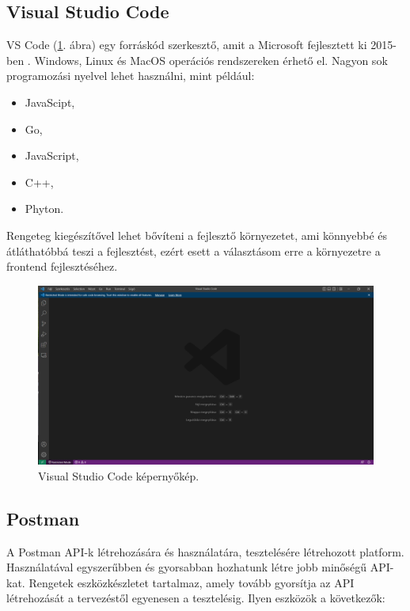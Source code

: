 \subsection{Visual Studio Code}

VS Code (\ref{fig:VSCode}. ábra) egy forráskód szerkesztő, amit a Microsoft fejlesztett ki 2015-ben \cite{VSCode}. Windows, Linux és MacOS operációs rendszereken érhető el. Nagyon sok programozási nyelvel lehet használni, mint például:

\begin{itemize}
\item JavaScipt,
\item Go,
\item JavaScript,
\item C++,
\item Phyton.
\end{itemize}

Rengeteg kiegészítővel lehet bővíteni a fejlesztő környezetet, ami könnyebbé és átláthatóbbá teszi a fejlesztést, ezért esett a választásom erre a környezetre a frontend fejlesztéséhez.

\begin{figure}[h]
\centering
\includegraphics[scale=0.6]{images/VSCode.png}
\caption{Visual Studio Code képernyőkép.}
\label{fig:VSCode}
\end{figure}


\subsection{Postman}

A Postman \cite{Postman} API-k létrehozására és használatára, tesztelésére létrehozott platform. Használatával egyszerűbben és gyorsabban hozhatunk létre jobb minőségű API-kat. Rengetek eszközkészletet tartalmaz, amely tovább gyorsítja az API létrehozását a  tervezéstől egyenesen a tesztelésig. Ilyen eszközök a következők:

